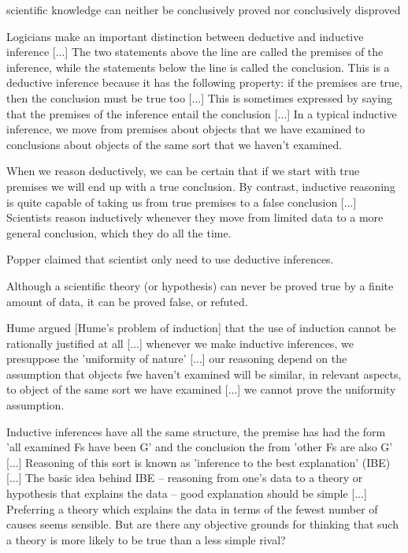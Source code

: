 {\color{red} scientific knowledge can neither be conclusively proved nor conclusively disproved}

{\color{red}

Logicians make an important distinction between deductive and inductive inference [...] The two statements above the line are called the premises of the inference, while the statements below the line is called the conclusion. This is a deductive inference because it has the following property: if the premises are true, then the conclusion must be true too [...] This is sometimes expressed by saying that the premises of the inference entail the conclusion [...] In a typical inductive inference, we move from premises about objects that we have examined to conclusions about objects of the same sort that we haven't examined.

When we reason deductively, we can be certain that if we start with true premises we will end up with a true conclusion. By contrast, inductive reasoning is quite capable of taking us from true premises to a false conclusion [...] Scientists reason inductively whenever they move from limited data to a more general conclusion, which they do all the time.

Popper claimed that scientist only need to use deductive inferences.

Although a scientific theory (or hypothesis) can never be proved true by a finite amount of data, it can be proved false, or refuted.

Hume argued [Hume's problem of induction] that the use of induction cannot be rationally justified at all [...] whenever we make inductive inferences, we presuppose the 'uniformity of nature' [...] our reasoning depend on the assumption that objects fwe haven't examined will be similar, in relevant aspects, to object of the same sort we have examined [...] we cannot prove the uniformity assumption.

Inductive inferences have all the same structure, the premise has had the form 'all examined Fs have been G' and the conclusion the from 'other Fs are also G' [...] Reasoning of this sort is known as 'inference to the best explanation' (IBE) [...] The basic idea behind IBE -- reasoning from one's data to a theory or hypothesis that explains the data -- good explanation should be simple [...] Preferring a theory which explains the data in terms of the fewest number of causes seems sensible. But are there any objective grounds for thinking that such a theory is more likely to be true than a less simple rival?

}

